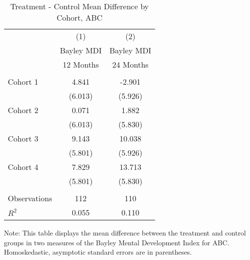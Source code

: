 \begin{table}[H] 
\begin{threeparttable}
\caption{Treatment - Control Mean Difference by Cohort, ABC}
\label{table:cohorts}
\centering 
\begin{tabular}{lcc} \toprule
 & (1) & (2) \\
 & Bayley MDI & Bayley MDI \\ 
 & 12 Months & 24 Months \\ \midrule
 &  &  \\
Cohort 1 & 4.841 & -2.901 \\
 & (6.013) & (5.926) \\
Cohort 2 & 0.071 & 1.882 \\
 & (6.013) & (5.830) \\
Cohort 3 & 9.143 & 10.038 \\
 & (5.801) & (5.926) \\
Cohort 4 & 7.829 & 13.713 \\
 & (5.801) & (5.830) \\ \\ \midrule
Observations & 112 & 110 \\
$R^2$ & 0.055 & 0.110 \\ \bottomrule
 \end{tabular}
\begin{tablenotes}
\footnotesize
\item Note: This table displays the mean difference between the treatment and control groups in two measures of the Bayley Mental Development Index for ABC. Homoskedastic, asymptotic standard errors are in parentheses.
\end{tablenotes}
\end{threeparttable}
\end{table}